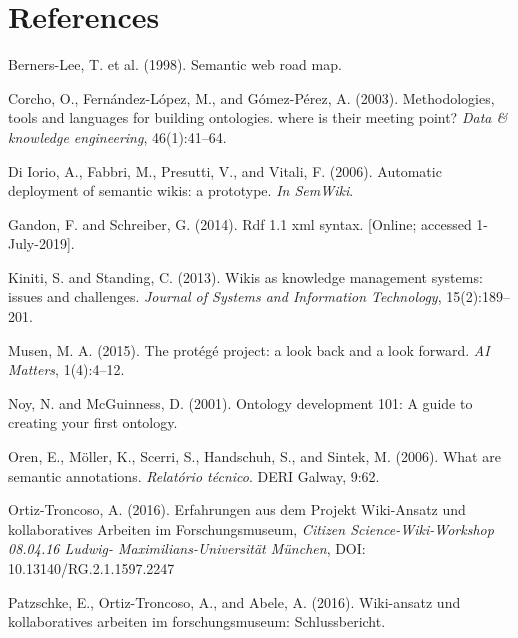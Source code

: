 \documentclass{ijcs_template}
\begin{document}
\section*{References}
\begin{thebibliography}
Berners-Lee, T. et al. (1998). Semantic web road map.

Corcho, O., Fernández-López, M., and Gómez-Pérez, A. (2003). Methodologies, tools and languages for
building ontologies. where is their meeting point? {\it Data \& knowledge engineering}, 46(1):41–64.

Di Iorio, A., Fabbri, M., Presutti, V., and Vitali, F. (2006). Automatic deployment of semantic wikis: a
prototype. {\it In SemWiki}.

Gandon, F. and Schreiber, G. (2014). Rdf 1.1 xml syntax. [Online; accessed 1-July-2019].

Kiniti, S. and Standing, C. (2013). Wikis as knowledge management systems: issues and challenges.
{\it Journal of Systems and Information Technology}, 15(2):189–201.

Musen, M. A. (2015). The protégé project: a look back and a look forward. {\it AI Matters}, 1(4):4–12.

Noy, N. and McGuinness, D. (2001). Ontology development 101: A guide to creating your first ontology.

Oren, E., Möller, K., Scerri, S., Handschuh, S., and Sintek, M. (2006). What are semantic annotations.
{\it Relatório técnico}. DERI Galway, 9:62.

Ortiz-Troncoso, A. (2016). Erfahrungen aus dem Projekt Wiki-Ansatz und kollaboratives Arbeiten im Forschungsmuseum,
{\it Citizen Science-Wiki-Workshop 08.04.16 Ludwig- Maximilians-Universit\"at München}, DOI: 10.13140/RG.2.1.1597.2247

Patzschke, E., Ortiz-Troncoso, A., and Abele, A. (2016). Wiki-ansatz und kollaboratives arbeiten im
forschungsmuseum: Schlussbericht.


\end{thebibliography}
\end{document}
